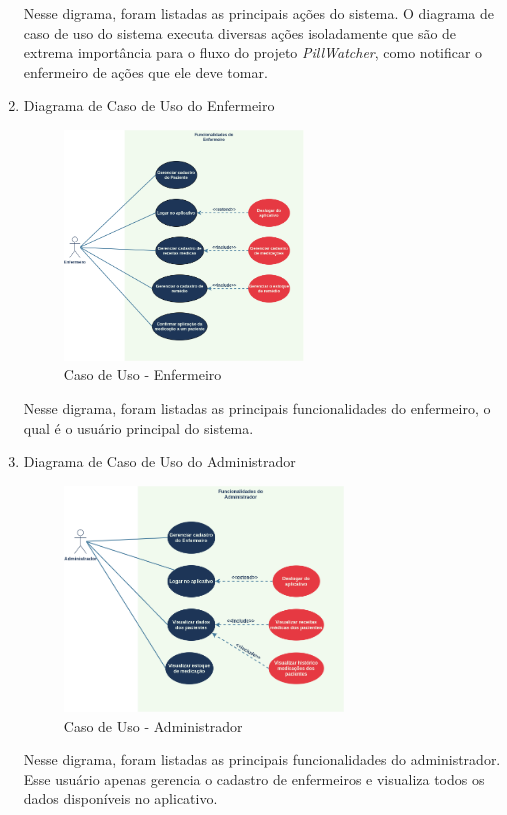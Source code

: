 \begin{enumerate}
Nesse digrama, foram listadas as principais ações do sistema. O diagrama de caso de uso do sistema executa diversas ações isoladamente que são de extrema importância para o fluxo do projeto \emph{PillWatcher}, como notificar o enfermeiro de ações que ele deve tomar.

    \item Diagrama de Caso de Uso do Enfermeiro
    
\begin{figure}[H]
    \centering
    \includegraphics[width=0.6\textwidth]{figuras/software/UML/enfermeiro-us.png}
    \caption{Caso de Uso - Enfermeiro}
    \label{fig:enfermeiro_us}
\end{figure}

Nesse digrama, foram listadas as principais funcionalidades do enfermeiro, o qual é o usuário principal do sistema.

    \item Diagrama de Caso de Uso do Administrador

\begin{figure}[H]
    \centering
    \includegraphics[width=0.7\textwidth]{figuras/software/UML/administrador-us.png}
    \caption{Caso de Uso - Administrador}
    \label{fig:administrador_us}
\end{figure}

Nesse digrama, foram listadas as principais funcionalidades do administrador. Esse usuário apenas gerencia o cadastro de enfermeiros e visualiza todos os dados disponíveis no aplicativo.

\end{enumerate}

